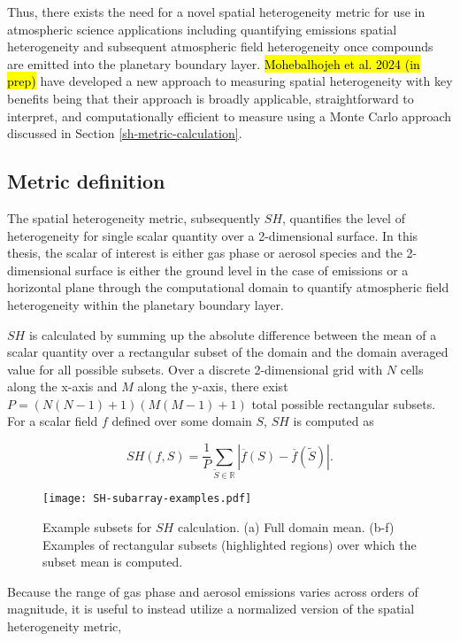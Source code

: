 Thus, there exists the need for a novel spatial heterogeneity metric for use in atmospheric science applications including quantifying emissions spatial heterogeneity and subsequent atmospheric field heterogeneity once compounds are emitted into the planetary boundary layer. \hl{Mohebalhojeh et al. 2024 (in prep)} have developed a new approach to measuring spatial heterogeneity with key benefits being that their approach is broadly applicable, straightforward to interpret, and computationally efficient to measure using a Monte Carlo approach discussed in Section \ref{sh-metric-calculation}.

\subsection{Metric definition}
The spatial heterogeneity metric, subsequently $SH$, quantifies the level of heterogeneity for single scalar quantity over a 2-dimensional surface. In this thesis, the scalar of interest is either gas phase or aerosol species and the 2-dimensional surface is either the ground level in the case of emissions or a horizontal plane through the computational domain to quantify atmospheric field heterogeneity within the planetary boundary layer.

$SH$ is calculated by summing up the absolute difference between the mean of a scalar quantity over a rectangular subset of the domain and the domain averaged value for all possible subsets. Over a discrete 2-dimensional grid with $N$ cells along the x-axis and $M$ along the y-axis, there exist \\$P=(N(N-1)+1)(M(M-1)+1)$ total possible rectangular subsets. For a scalar field $f$ defined over some domain $S$, $SH$ is computed as

\begin{equation}
SH(f, S) = \frac{1}{P}\sum_{\tilde{S}\in \mathbb{R}}|\overline{f}(S) - \overline{f}(\tilde{S})|.
\end{equation}

\begin{figure}[h]
	\centering
	\texttt{[image: SH-subarray-examples.pdf]}
	\caption{Example subsets for $SH$ calculation. (a) Full domain mean. (b-f) Examples of rectangular subsets (highlighted regions) over which the subset mean is computed.}
	\label{fig:sh-subarrays}
\end{figure}

Because the range of gas phase and aerosol emissions varies across orders of magnitude, it is useful to instead utilize a normalized version of the spatial heterogeneity metric,

